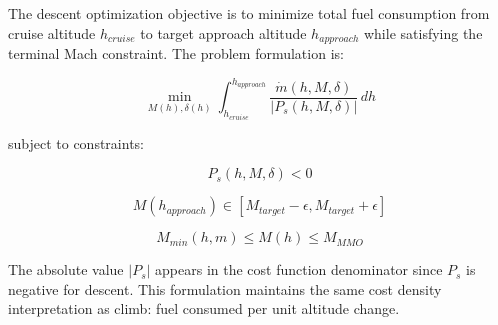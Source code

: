 The descent optimization objective is to minimize total fuel consumption from cruise altitude $h_{cruise}$ to target approach altitude $h_{approach}$ while satisfying the terminal Mach constraint. The problem formulation is:

\begin{equation}
\min_{M(h), \delta(h)} \int_{h_{cruise}}^{h_{approach}} \frac{\dot{m}(h, M, \delta)}{|P_s(h, M, \delta)|} \, dh
\end{equation}

subject to constraints:

\begin{equation}
P_s(h, M, \delta) < 0
\end{equation}

\begin{equation}
M(h_{approach}) \in [M_{target} - \epsilon, M_{target} + \epsilon]
\end{equation}

\begin{equation}
M_{min}(h, m) \leq M(h) \leq M_{MMO}
\end{equation}

The absolute value $|P_s|$ appears in the cost function denominator since $P_s$ is negative for descent. This formulation maintains the same cost density interpretation as climb: fuel consumed per unit altitude change.
